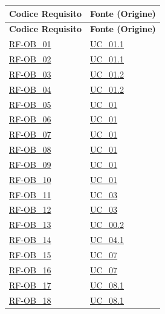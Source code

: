 \renewcommand{\arraystretch}{1.15}
\begin{longtable}{|>{\raggedright}p{}|>{\raggedright\arraybackslash}p{}|}
    \hline
    \rowcolor[gray]{0.9}
    \textbf{Codice Requisito} & \textbf{Fonte (Origine)} \\
    \hline
    \endfirsthead
    
    \hline
    \rowcolor[gray]{0.9}
    \textbf{Codice Requisito} & \textbf{Fonte (Origine)} \\
    \hline
    \endhead

    \hline
    \hyperlink{rf-ob_1}{RF-OB\_01} & \hyperref[uc_01.1]{UC\_01.1} \\ \hline
    \hyperlink{rf-ob_2}{RF-OB\_02} & \hyperref[uc_01.1]{UC\_01.1} \\ \hline
    \hyperlink{rf-ob_3}{RF-OB\_03} & \hyperref[uc_01.2]{UC\_01.2} \\ \hline
    \hyperlink{rf-ob_4}{RF-OB\_04} & \hyperref[uc_01.2]{UC\_01.2} \\ \hline
    \hyperlink{rf-ob_5}{RF-OB\_05} & \hyperref[uc_01]{UC\_01} \\ \hline
    \hyperlink{rf-ob_6}{RF-OB\_06} & \hyperref[uc_01]{UC\_01} \\ \hline
    \hyperlink{rf-ob_7}{RF-OB\_07} & \hyperref[uc_01]{UC\_01} \\ \hline
    \hyperlink{rf-ob_8}{RF-OB\_08} & \hyperref[uc_01]{UC\_01} \\ \hline
    \hyperlink{rf-ob_9}{RF-OB\_09} & \hyperref[uc_01]{UC\_01} \\ \hline
    \hyperlink{rf-ob_10}{RF-OB\_10} & \hyperref[uc_01]{UC\_01} \\ \hline
    \hyperlink{rf-ob_11}{RF-OB\_11} & \hyperref[uc_03]{UC\_03} \\ \hline
    \hyperlink{rf-ob_12}{RF-OB\_12} & \hyperref[uc_03]{UC\_03} \\ \hline
    \hyperlink{rf-ob_13}{RF-OB\_13} & \hyperref[uc_00.2]{UC\_00.2} \\ \hline
    \hyperlink{rf-ob_14}{RF-OB\_14} & \hyperref[uc_04.1]{UC\_04.1} \\ \hline
    \hyperlink{rf-ob_15}{RF-OB\_15} & \hyperref[uc_07]{UC\_07} \\ \hline
    \hyperlink{rf-ob_16}{RF-OB\_16} & \hyperref[uc_07]{UC\_07} \\ \hline
    \hyperlink{rf-ob_17}{RF-OB\_17} & \hyperref[uc_08.1]{UC\_08.1} \\ \hline
    \hyperlink{rf-ob_18}{RF-OB\_18} & \hyperref[uc_08.1]{UC\_08.1} \\ \hline

\end{longtable}
